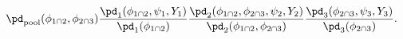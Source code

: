 \begin{equation}
  \pd_{\text{pool}}(\phi_{1 \cap 2}, \phi_{2 \cap 3})
  \frac {
    \pd_{1} (\phi_{1 \cap 2}, \psi_{1}, Y_{1})
  } {
    \pd_{1}(\phi_{1 \cap 2})
  }
  \frac {
    \pd_{2} (\phi_{1 \cap 2}, \phi_{2 \cap 3}, \psi_{2}, Y_{2})
  } {
    \pd_{2}(\phi_{1 \cap 2}, \phi_{2 \cap 3})
  }
  \frac {
    \pd_{3} (\phi_{2 \cap 3}, \psi_{3}, Y_{3})
  } {
    \pd_{3}(\phi_{2 \cap 3})
  }.
  \label{eqn:melded-model-full}
\end{equation}